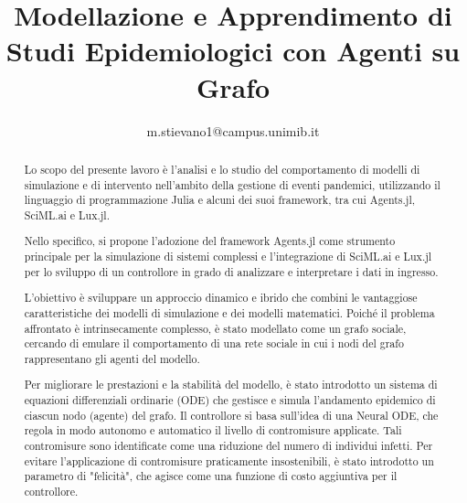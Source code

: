 \documentclass[11pt,a4paper,fleqn]{article}
\title{Modellazione e Apprendimento di Studi Epidemiologici con Agenti su Grafo}
\author{m.stievano1@campus.unimib.it}
\begin{document}


\begin{abstract}
    Lo scopo del presente lavoro è l'analisi e lo studio del comportamento 
    di modelli di simulazione e di intervento nell'ambito della gestione 
    di eventi pandemici, utilizzando il linguaggio di programmazione Julia 
    e alcuni dei suoi framework, tra cui Agents.jl, SciML.ai e Lux.jl.

    Nello specifico, si propone l'adozione del framework Agents.jl come 
    strumento principale per la simulazione di sistemi complessi e 
    l'integrazione di SciML.ai e Lux.jl per lo sviluppo di un controllore 
    in grado di analizzare e interpretare i dati in ingresso. 
    
    L'obiettivo è sviluppare un approccio dinamico e ibrido che combini 
    le vantaggiose caratteristiche dei modelli di simulazione e dei 
    modelli matematici. Poiché il problema affrontato è intrinsecamente 
    complesso, è stato modellato come un grafo sociale, 
    cercando di emulare il comportamento di una rete sociale in cui i 
    nodi del grafo rappresentano gli agenti del modello.
    
    Per migliorare le prestazioni e la stabilità del modello, è stato 
    introdotto un sistema di equazioni differenziali ordinarie (ODE) 
    che gestisce e simula l'andamento epidemico di ciascun nodo (agente) 
    del grafo. Il controllore si basa sull'idea di una Neural ODE, 
    che regola in modo autonomo e automatico il livello di contromisure 
    applicate. Tali contromisure sono identificate come una riduzione 
    del numero di individui infetti. Per evitare l'applicazione di 
    contromisure praticamente insostenibili, è stato introdotto un 
    parametro di "felicità", che agisce come una funzione di costo 
    aggiuntiva per il controllore.
\end{abstract}


\tableofcontents
\newpage
\listoffigures
\listoftables
\newpage
















\nocite{*}



\appendix

\end{document}
